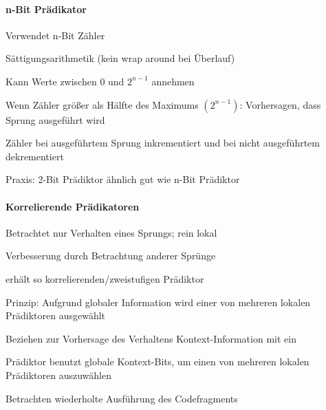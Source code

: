 \documentclass[a4paper]{article}
\begin{document}
\begin{multicols}{3}
  \paragraph{n-Bit Prädikator}
  \begin{itemize*}
    \item Verwendet n-Bit Zähler
    \item Sättigungsarithmetik (kein wrap around bei Überlauf)
    \item Kann Werte zwischen $0$ und $2^{n-1}$ annehmen
    \item Wenn Zähler größer als Hälfte des Maximums $(2^{n-1})$: Vorhersagen, dass Sprung ausgeführt wird
    \item Zähler bei ausgeführtem Sprung inkrementiert und bei nicht ausgeführtem dekrementiert
    \item Praxis: 2-Bit Prädiktor ähnlich gut wie n-Bit Prädiktor
  \end{itemize*}
  
  \paragraph{Korrelierende Prädikatoren}
  \begin{itemize*}
    \item Betrachtet nur Verhalten eines Sprungs; rein lokal
    \item Verbesserung durch Betrachtung anderer Sprünge
    \item erhält so korrelierenden/zweistufigen Prädiktor
    \item Prinzip: Aufgrund globaler Information wird einer von mehreren lokalen Prädiktoren ausgewählt
    \item Beziehen zur Vorhersage des Verhaltens Kontext-Information mit ein
    \item Prädiktor benutzt globale Kontext-Bits, um einen von mehreren lokalen Prädiktoren auszuwählen
    \item Betrachten wiederholte Ausführung des Codefragments
  \end{itemize*}
  

\end{multicols}
\end{document}
